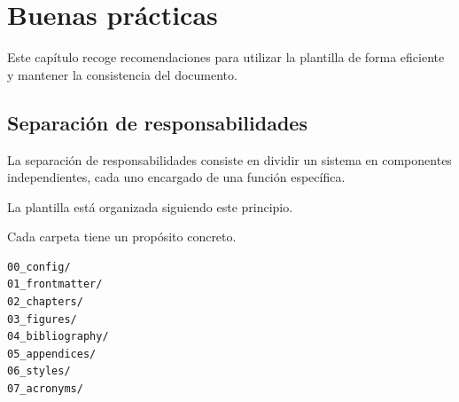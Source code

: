 %
%
%
%
%
%
%
%
%
%


\chapter{Buenas prácticas}

Este capítulo recoge recomendaciones para utilizar
la plantilla de forma eficiente y mantener la
consistencia del documento.




\section{Separación de responsabilidades}

\begin{definitionbox}
La separación de responsabilidades consiste en dividir
un sistema en componentes independientes, cada uno
encargado de una función específica.
\end{definitionbox}

La plantilla está organizada siguiendo este principio.

Cada carpeta tiene un propósito concreto.



\begin{lstlisting}[caption={Arquitectura de carpetas},label={code:structure}]
00_config/
01_frontmatter/
02_chapters/
03_figures/
04_bibliography/
05_appendices/
06_styles/
07_acronyms/
\end{lstlisting}

